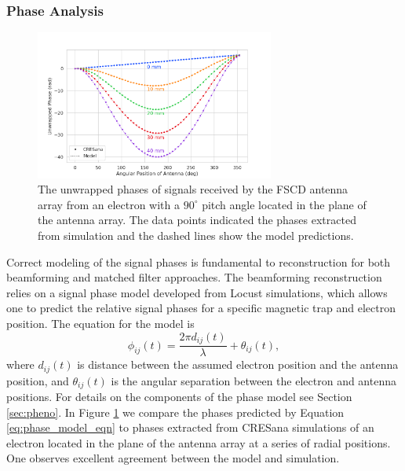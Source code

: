 \subsubsection{Phase Analysis}

\begin{figure}[htbp]
    \centering
    \includegraphics[width=0.7\textwidth]{figs/Chapter-5/230504_cresana_phases.png}
    \caption{The unwrapped phases of signals received by the FSCD antenna array from an electron with a $90^\circ$ pitch angle located in the plane of the antenna array. The data points indicated the phases extracted from simulation and the dashed lines show the model predictions. }
    \label{fig:cresana_simulated_phases}
\end{figure}

Correct modeling of the signal phases is fundamental to reconstruction for both beamforming and matched filter approaches. The beamforming reconstruction relies on a signal phase model developed from Locust simulations, which allows one to predict the relative signal phases for a specific magnetic trap and electron position. The equation for the model is
\begin{equation}
    \phi_{ij}(t) = \frac{2\pi d_{ij}(t)}{\lambda} + \theta_{ij}(t),
    \label{eq:phase_model_eqn}
\end{equation}
where $d_{ij}(t)$ is distance between the assumed electron position and the antenna position, and $\theta_{ij}(t)$ is the angular separation between the electron and antenna positions. For details on the components of the phase model see Section \ref{sec:pheno}. In Figure \ref{fig:cresana_simulated_phases} we compare the phases predicted by Equation \ref{eq:phase_model_eqn} to phases extracted from CRESana simulations of an electron located in the plane of the antenna array at a series of radial positions. One observes excellent agreement between the model and simulation.

